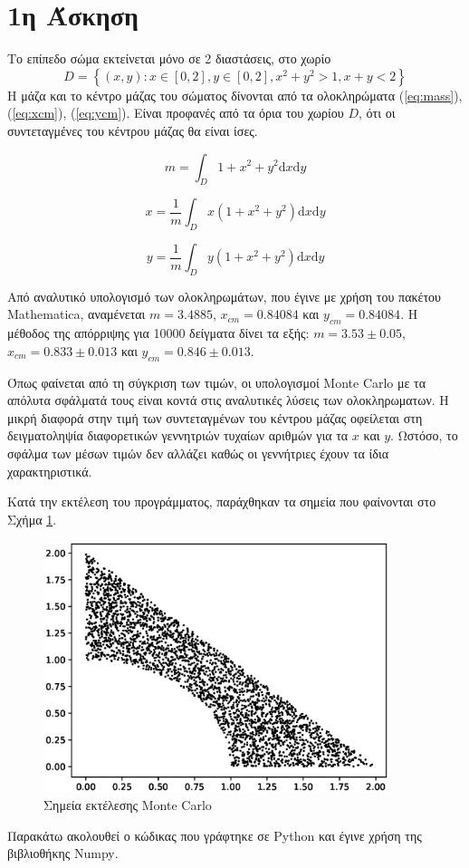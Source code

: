\documentclass[assignment1.tex]{subfiles}
\begin{document}
\section*{1η Άσκηση}

Το επίπεδο σώμα εκτείνεται μόνο σε 2 διαστάσεις, στο χωρίο $$D=\left\{(x,y): x\in[0,2], y\in[0,2], x^2+y^2>1, x+y<2\right\}$$ Η μάζα και το κέντρο μάζας του σώματος δίνονται από τα ολοκληρώματα (\ref{eq:mass}), (\ref{eq:xcm}), (\ref{eq:ycm}). Είναι προφανές από τα όρια του χωρίου $D$, ότι οι συντεταγμένες του κέντρου μάζας θα είναι ίσες.

\begin{equation}
m=\int_D 1+x^2+y^2 \mathrm{d}x \mathrm{d}y
\label{eq:mass}
\end{equation}

\begin{equation}
x=\frac{1}{m}\int_D x\left(1+x^2+y^2\right) \mathrm{d}x \mathrm{d}y
\label{eq:xcm}
\end{equation}

\begin{equation}
y=\frac{1}{m}\int_D y\left(1+x^2+y^2\right) \mathrm{d}x \mathrm{d}y
\label{eq:ycm}
\end{equation}

Από αναλυτικό υπολογισμό των ολοκληρωμάτων, που έγινε με χρήση του πακέτου \textlatin{Mathematica}, αναμένεται $m=3.4885$, $x_{cm}=0.84084$ και $y_{cm}=0.84084$. Η μέθοδος της απόρριψης για 10000 δείγματα δίνει τα εξής: $m=3.53\pm0.05$, $x_{cm}=0.833\pm0.013$ και $y_{cm}=0.846\pm0.013$. 

Όπως φαίνεται από τη σύγκριση των τιμών, οι υπολογισμοί \textlatin{Monte Carlo} με τα απόλυτα σφάλματά τους είναι κοντά στις αναλυτικές λύσεις των ολοκληρωματων. Η μικρή διαφορά στην τιμή των συντεταγμένων του κέντρου μάζας οφείλεται στη δειγματοληψία διαφορετικών γεννητριών τυχαίων αριθμών για τα $x$ και $y$. Ωστόσο, το σφάλμα των μέσων τιμών δεν αλλάζει καθώς οι γεννήτριες έχουν τα ίδια χαρακτηριστικά.

Κατά την εκτέλεση του προγράμματος, παράχθηκαν τα σημεία που φαίνονται στο Σχήμα \ref{fig:rejection}.

\begin{figure}[hp]
\includegraphics[width=0.9\textwidth]{rejection.eps}
\centering
\caption{Σημεία εκτέλεσης \textlatin{Monte Carlo}}
\label{fig:rejection}
\end{figure} 

\FloatBarrier

Παρακάτω ακολουθεί ο κώδικας που γράφτηκε σε \textlatin{Python} και έγινε χρήση της βιβλιοθήκης \textlatin{Numpy}.


\end{document}
